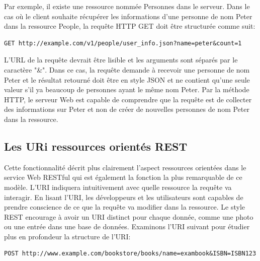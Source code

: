 Par exemple, il existe une ressource nommée Personnes dans le serveur. Dans le cas où le client souhaite récupérer les informations d'une personne de nom Peter dans la ressource People, la requête HTTP GET doit être structurée comme suit:

\begin{verbatim}
GET http://example.com/v1/people/user_info.json?name=peter&count=1
\end{verbatim}

L'URL de la requête devrait être lisible et les arguments sont séparés par le caractère "\&". Dans ce cas, la requête demande à recevoir une personne de nom Peter et le résultat retourné doit être en style JSON et ne contient qu'une seule valeur s'il ya beaucoup de personnes ayant le même nom Peter. Par la méthode HTTP, le serveur Web est capable de comprendre que la requête est de collecter des informations sur Peter et non  de créer de nouvelles personnes de nom Peter dans la ressource.

\subsection{Les URi ressources orientés REST}
Cette fonctionnalité décrit plus clairement  l'aspect ressources orientées dans le service Web RESTful qui est également la fonction la plus remarquable de ce modèle. L'URI indiquera intuitivement avec quelle ressource la requête va interagir. En lisant l'URI, les développeurs et les utilisateurs sont capables de prendre conscience de ce que la requête va modifier dans la ressource. Le style REST encourage à avoir un URI distinct pour chaque donnée, comme une photo ou une entrée dans une base de données. Examinons l'URI suivant pour étudier plus en profondeur la structure de l'URI:
\begin{verbatim}
POST http://www.example.com/bookstore/books/name=exambook&ISBN=ISBN123
\end{verbatim}

